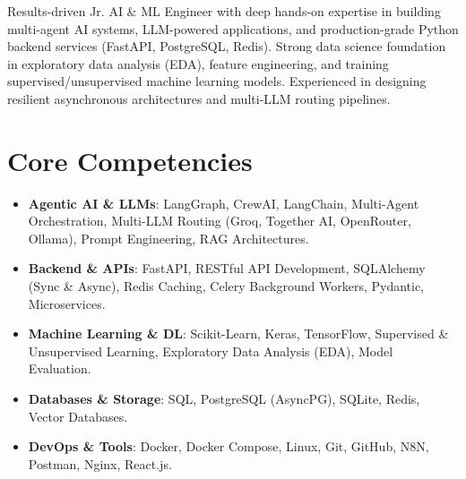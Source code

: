 \documentclass[11pt,a4paper,sans]{moderncv}
\begin{document}
\makecvtitle


\vspace{4pt}
\small{Results-driven Jr. AI \& ML Engineer with deep hands-on expertise in building multi-agent AI systems, LLM-powered applications, and production-grade Python backend services (FastAPI, PostgreSQL, Redis). Strong data science foundation in exploratory data analysis (EDA), feature engineering, and training supervised/unsupervised machine learning models. Experienced in designing resilient asynchronous architectures and multi-LLM routing pipelines.}


\section{Core Competencies}
\vspace{1pt}
\begin{itemize}
\item \textbf{Agentic AI \& LLMs}: LangGraph, CrewAI, LangChain, Multi-Agent Orchestration, Multi-LLM Routing (Groq, Together AI, OpenRouter, Ollama), Prompt Engineering, RAG Architectures.
\item \textbf{Backend \& APIs}: FastAPI, RESTful API Development, SQLAlchemy (Sync \& Async), Redis Caching, Celery Background Workers, Pydantic, Microservices.
\item \textbf{Machine Learning \& DL}: Scikit-Learn, Keras, TensorFlow, Supervised \& Unsupervised Learning, Exploratory Data Analysis (EDA), Model Evaluation.
\item \textbf{Databases \& Storage}: SQL, PostgreSQL (AsyncPG), SQLite, Redis, Vector Databases.
\item \textbf{DevOps \& Tools}: Docker, Docker Compose, Linux, Git, GitHub, N8N, Postman, Nginx, React.js.
\end{itemize}

\end{document}
